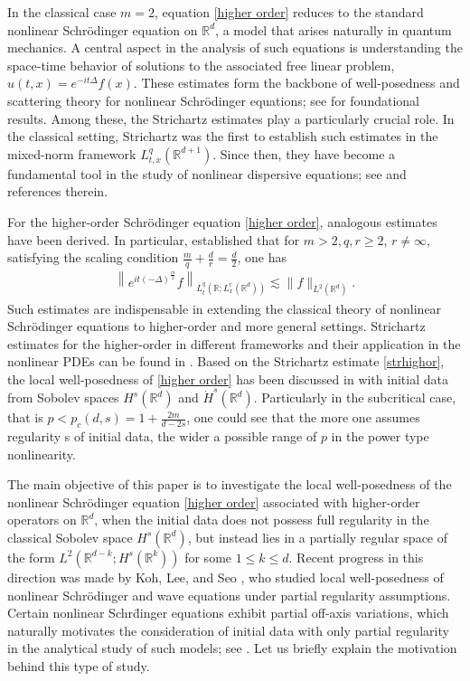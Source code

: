 \documentclass[a4paper,11pt, reqno]{amsart}
\theoremstyle{definition}
\theoremstyle{remark}
\numberwithin{equation}{section}
\begin{document}
In the classical case $m = 2$, equation \eqref{higher order} reduces to the standard nonlinear Schr\"odinger equation on $\mathbb{R}^d$, a model that arises naturally in quantum mechanics. A central aspect in the analysis of such equations is understanding the space-time behavior of solutions to the associated free linear problem, $u(t, x) = e^{  -it\Delta} f(x)$. These estimates form the backbone of well-posedness and scattering theory for nonlinear Schr\"odinger equations; see \cite{GV85, GV92, KT98, St77, Ka96} for foundational results. Among these, the Strichartz estimates play a particularly crucial role. In the classical setting, Strichartz \cite{St77} was the first to establish such estimates in the mixed-norm framework $L^q_{t,x}(\mathbb{R}^{d+1})$. Since then, they have become a fundamental tool in the study of nonlinear dispersive equations; see \cite{Bahouri-app} and references therein.

For the higher-order Schr\"odinger equation \eqref{higher order}, analogous estimates have been derived. In particular, \cite{CHL11} established that for $m>2, q, r \geq 2$, $r \neq \infty$, satisfying the scaling condition $\frac{m}{q} + \frac{d}{r} = \frac{d}{2}$, one has
\begin{align} \label{strhighor}
\left\|e^{it (-\Delta)^{\frac{m}{2}}}f\right\|_{L_t^q\left(\mathbb{R}; L_x^r\left(\mathbb{R}^{d}\right)\right)} \lesssim \|f\|_{L^2(\mathbb{R}^{d})}.
\end{align}
Such estimates are indispensable in extending the classical theory of nonlinear Schr\"odinger equations to higher-order and more general settings. Strichartz estimates for  the higher-order in different frameworks  and their application in the nonlinear PDEs can be found in \cite{KS17, KS00, Ka96, CHL11}. Based on the Strichartz estimate \eqref{strhighor}, the local well-posedness of \eqref{higher order} has been discussed in  \cite{CHL11, HS15, Dinh18, Dinh19} with initial data from Sobolev spaces $H^s(\mathbb{R}^d)$ and $\dot{H}^s(\mathbb{R}^d).$ Particularly in the subcritical case, that is $p<p_c(d, s)=1+\frac{2m}{d-2s}$, one could see that the more one assumes regularity s of initial data, the wider a possible range of $p$ in the power type nonlinearity.

The main objective of this paper is to investigate the local well-posedness of the nonlinear Schr\"odinger equation \eqref{higher order} associated with higher-order operators on $\mathbb{R}^d$, when the initial data does not possess full regularity in the classical Sobolev space $H^s(\mathbb{R}^d)$, but instead lies in a partially regular space of the form $L^2(\mathbb{R}^{d-k}; H^{s} (\mathbb{R}^k))$ for some $1 \leq k \leq d$. Recent progress in this direction was made by Koh, Lee, and Seo \cite{KLS23}, who studied local well-posedness of nonlinear Schr\"odinger and wave equations under partial regularity assumptions. Certain nonlinear Schr\"dinger equations exhibit partial off-axis variations, which naturally motivates the consideration of initial data with only partial regularity in the analytical study of such models; see \cite{AA, Ak}.
 Let us briefly explain the motivation behind this type of study.
\end{document}
